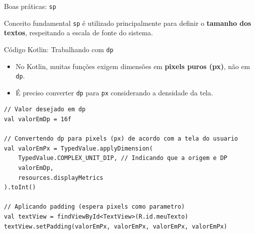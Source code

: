 \documentclass[aspectratio=169]{beamer}
\begin{document}
\begin{frame}{Boas práticas: \texttt{sp}}
\begin{center}

\end{center}

\vspace{0.1cm}

\begin{block}{Conceito fundamental}
\centering
\texttt{sp} é utilizado principalmente para definir
o \textbf{tamanho dos textos}, respeitando a escala de fonte do sistema.
\end{block}

\end{frame}
\begin{frame}[fragile]{Código Kotlin: Trabalhando com \texttt{dp}}
\begin{itemize}
    \item No Kotlin, muitas funções exigem dimensões em \textbf{pixels puros (px)}, não em \texttt{dp}.
    \item É preciso converter \texttt{dp} para \texttt{px} considerando a densidade da tela.
\end{itemize}
\vspace{0.2cm}
\begin{lstlisting}[style=KotlinStyle]
// Valor desejado em dp
val valorEmDp = 16f

// Convertendo dp para pixels (px) de acordo com a tela do usuario
val valorEmPx = TypedValue.applyDimension(
    TypedValue.COMPLEX_UNIT_DIP, // Indicando que a origem e DP
    valorEmDp,
    resources.displayMetrics
).toInt()

// Aplicando padding (espera pixels como parametro)
val textView = findViewById<TextView>(R.id.meuTexto)
textView.setPadding(valorEmPx, valorEmPx, valorEmPx, valorEmPx)
\end{lstlisting}
\end{frame}
\end{document}

